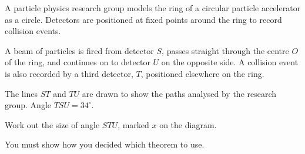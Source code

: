 \documentclass[11pt]{article}
\begin{document}
\begin{question}
\noindent A particle physics research group models the ring of a circular particle accelerator as a circle. Detectors are positioned at fixed points around the ring to record collision events.

A beam of particles is fired from detector $S$, passes straight through the centre $O$ of the ring, and continues on to detector $U$ on the opposite side. A collision event is also recorded by a third detector, $T$, positioned elsewhere on the ring.

The lines $ST$ and $TU$ are drawn to show the paths analysed by the research group. Angle $TSU = 34^\circ$.

\begin{center}
\end{center}

\noindent Work out the size of angle $STU$, marked $x$ on the diagram.

\vspace{1cm}
\noindent You must show how you decided which theorem to use.
\vspace{5cm}

\begin{flushright}
\end{flushright}
\end{question}
\end{document}
